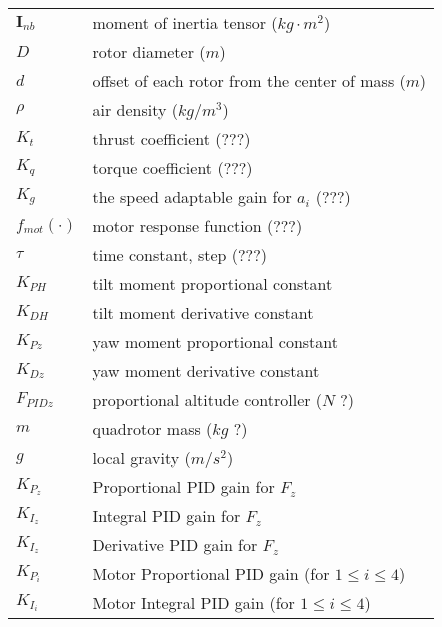 \documentclass{article}
\numberwithin{equation}{section} %
\newcommand{\bs}[1]{\boldsymbol{#1}}
\begin{document}
\begin{longtable}{p{2cm}p{8cm}}
 	$ \bs{I}_{nb} $			& moment of inertia tensor ($kg \cdot m^{2}$) \\
 	$ D $ 					& rotor diameter ($m$) \\
 	$ d $					& offset of each rotor from the center of mass ($m$) \\
 	$ \rho $				& air density ($kg/m^3$) \\
 	$ K_t $					& thrust coefficient ($???$) \\
 	$ K_q $					& torque coefficient ($???$) \\
 	$ K_g $					& the speed adaptable gain for $a_i$ ($???$) \\
 	$ f_{mot}( \cdot ) $	& motor response function ($???$) \\
 	$ \tau $				& time constant, step ($???$) \\
 	$K_{PH} $				& tilt moment proportional constant \\
 	$K_{DH} $				& tilt moment derivative constant \\
 	$K_{Pz} $				& yaw moment proportional constant \\
 	$K_{Dz} $				& yaw moment derivative constant \\
 	$F_{PIDz} $				& proportional altitude controller ($N$ ?) \\
 	$m$						& quadrotor mass ($kg$ ?) \\
 	$g$						& local gravity ($m/s^2$) \\
 	$K_{P_z}$				& Proportional PID gain for $F_z$ \\
	$K_{I_z}$				& Integral PID gain for $F_z$ \\
	$K_{I_z}$				& Derivative PID gain for $F_z$ \\
 	$ K_{P_i} $				& Motor Proportional PID gain (for $1 \leq i \leq 4$) \\
 	$ K_{I_i} $				& Motor Integral PID gain (for $1 \leq i \leq 4$) \\
 	
\end{longtable}

\end{document}

